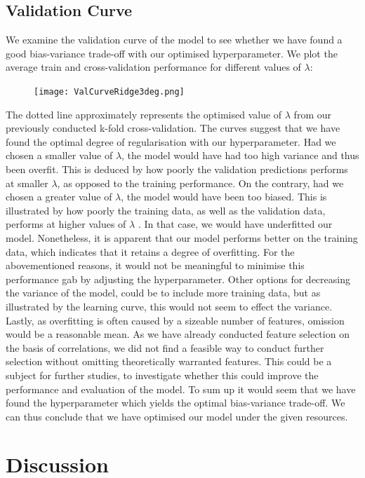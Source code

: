 \documentclass[12pt,a4paper]{article}
\begin{document}
\subsection{Validation Curve}
We examine the validation curve of the model to see whether we have found a good bias-variance trade-off with our optimised hyperparameter. We plot the average train and cross-validation performance for different values of $\lambda$: 
\begin{figure}[H]
\centering
\caption{}
\texttt{[image: ValCurveRidge3deg.png]}
\end{figure}
The dotted line approximately represents the optimised value of $\lambda$ from our previously conducted k-fold cross-validation. 
The curves suggest that we have found the optimal degree of regularisation with our hyperparameter. Had we chosen a smaller value of $\lambda$, the model would have had too high variance and thus been overfit. This is deduced by how poorly the validation predictions performs at smaller $\lambda$, as opposed to the training performance. On the contrary, had we chosen a greater value of $\lambda$, the model would have been too biased. This is illustrated by how poorly the training data, as well as the validation data, performs at higher values of $\lambda$ . In that case, we would have underfitted our model. 
Nonetheless, it is apparent that our model performs better on the training data, which indicates that it retains a degree of overfitting. For the abovementioned reasons, it would not be meaningful to minimise this performance gab by adjusting the hyperparameter. Other options for decreasing the variance of the model, could be to include more training data, but as illustrated by the learning curve, this would not seem to effect the variance. Lastly, as overfitting is often caused by a sizeable number of features, omission would be a reasonable mean. As we have already conducted feature selection on the basis of correlations, we did not find a feasible way to conduct further selection without omitting theoretically warranted features. This could be a subject for further studies, to investigate whether this could improve the performance and evaluation of the model. \newline
To sum up it would seem that we have found the hyperparameter which yields the optimal bias-variance trade-off. We can thus conclude that we have optimised our model under the given resources. 


\section{Discussion}
\end{document}
